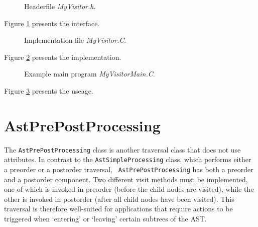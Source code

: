 \begin{figure}
\begin{latexonly}
   
\end{latexonly}

\begin{htmlonly}
   
\end{htmlonly}
\caption{Headerfile {\em MyVisitor.h}.}
\label{AstProcessing:myvisitor1}
\end{figure}

Figure \ref{AstProcessing:myvisitor1} presents the interface.

\begin{figure}
\begin{latexonly}
   
\end{latexonly}

\begin{htmlonly}
   
\end{htmlonly}
\caption{Implementation file {\em MyVisitor.C}.}
\label{AstProcessing:myvisitor2}
\end{figure}

Figure \ref{AstProcessing:myvisitor2} presents the implementation.

\begin{figure}
\begin{latexonly}
   
\end{latexonly}

\begin{htmlonly}
   
\end{htmlonly}
\caption{Example main program {\em MyVisitorMain.C}.}
\label{AstProcessing:myvisitor3}
\end{figure}

Figure \ref{AstProcessing:myvisitor3} presents the useage.

\section{AstPrePostProcessing}
\label{AstProcessing:AstPrePostProcessing}

The {\tt AstPrePostProcessing} class is another traversal class that does not
use attributes. In contrast to the {\tt AstSimpleProcessing} class, which
performs either a preorder or a postorder traversal, {\tt
AstPrePostProcessing} has both a preorder and a postorder component. Two
different visit methods must be implemented, one of which is invoked in
preorder (before the child nodes are visited), while the other is invoked in
postorder (after all child nodes have been visited). This traversal is
therefore well-suited for applications that require actions to be triggered
when `entering' or `leaving' certain subtrees of the AST.

